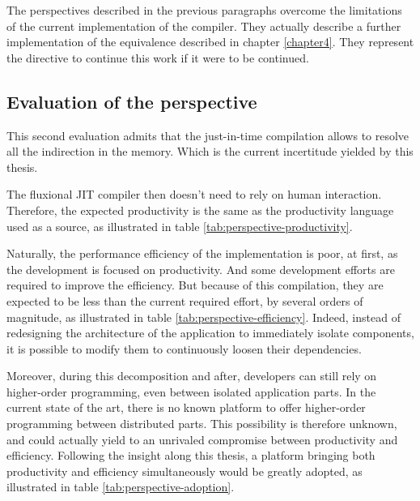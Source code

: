 
\separator

The perspectives described in the previous paragraphs overcome the limitations of the current implementation of the compiler.
They actually describe a further implementation of the equivalence described in chapter \ref{chapter4}.
They represent the directive to continue this work if it were to be continued.

\subsection{Evaluation of the perspective}

This second evaluation admits that the just-in-time compilation allows to resolve all the indirection in the memory.
Which is the current incertitude yielded by this thesis.

The fluxional JIT compiler then doesn't need to rely on human interaction.
Therefore, the expected productivity is the same as the productivity language used as a source, as illustrated in table \ref{tab:perspective-productivity}.


Naturally, the performance efficiency of the implementation is poor, at first, as the development is focused on productivity.
And some development efforts are required to improve the efficiency.
But because of this compilation, they are expected to be less than the current required effort, by several orders of magnitude, as illustrated in table \ref{tab:perspective-efficiency}.
Indeed, instead of redesigning the architecture of the application to immediately isolate components, it is possible to modify them to continuously loosen their dependencies.


Moreover, during this decomposition and after, developers can still rely on higher-order programming, even between isolated application parts.
In the current state of the art, there is no known platform to offer higher-order programming between distributed parts.
This possibility is therefore unknown, and could actually yield to an unrivaled compromise between productivity and efficiency.
Following the insight along this thesis, a platform bringing both productivity and efficiency simultaneously would be greatly adopted, as illustrated in table \ref{tab:perspective-adoption}.


\separator

